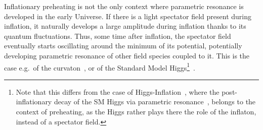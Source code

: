 \documentclass[a4paper,11pt]{article}
\begin{document}
Inflationary preheating is not the only context where parametric resonance is developed in the early Universe. If there is a light spectator field present during inflation, it naturally develops a large amplitude during inflation thanks to its quantum fluctuations. Thus, some time after inflation, the spectator field eventually starts oscillating around the minimum of its potential, potentially developing parametric resonance of other field species coupled to it. This is the case e.g.~of the curvaton~\cite{Enqvist:2001zp,Lyth:2001nq,Moroi:2001ct,Mazumdar:2010sa,Enqvist:2008be, Enqvist:2012tc, Enqvist:2013qba, Enqvist:2013gwf}, or of the Standard Model Higgs\footnote{Note that this differs from the case of Higgs-Inflation~\cite{Bezrukov:2007ep,Bezrukov:2010jz}, where the post-inflationary decay of the SM Higgs via parametric resonance~\cite{Bezrukov:2008ut,GarciaBellido:2008ab,Figueroa:2009jw,Figueroa:2014aya}, belongs to the context of preheating, as the Higgs rather plays there the role of the inflaton, instead of a spectator field.}~\cite{DeSimone:2012qr,Enqvist:2013kaa,Enqvist:2014tta,Herranen:2015ima,Figueroa:2014aya,Figueroa:2015rqa,Enqvist:2015sua,Figueroa:2016dsc}. 
\end{document}
